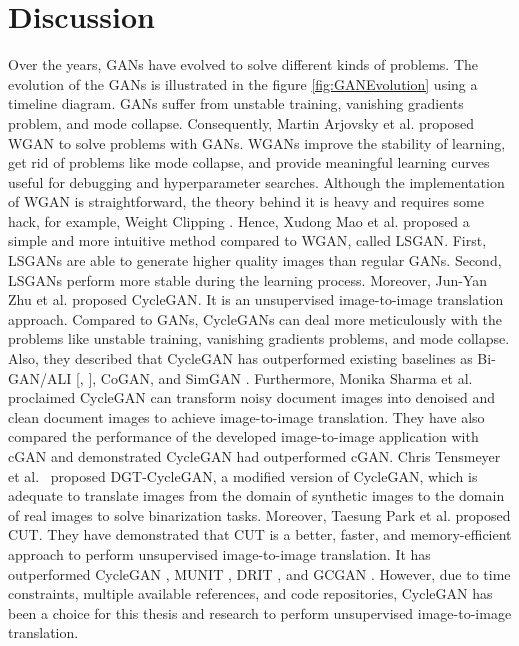 \section{Discussion}\label{rwdiscussion}
Over the years, \acp{GAN} have evolved to solve different kinds of problems. The evolution of the \acp{GAN} is illustrated in the figure \ref{fig:GANEvolution} using a timeline diagram. \acp{GAN} suffer from unstable training, vanishing gradients problem, and mode collapse. Consequently, Martin Arjovsky et al.\cite{arjovsky2017wasserstein} proposed \ac{WGAN} to solve problems with \acp{GAN}. \acp{WGAN} improve the stability of learning, get rid of problems like mode collapse, and provide meaningful learning curves useful for debugging and hyperparameter searches. Although the implementation of \ac{WGAN} is straightforward, the theory behind it is heavy and requires some hack, for example, Weight Clipping  \cite{gulrajani2017improved}. Hence, Xudong Mao et al.\cite{mao2017squares} proposed a simple and more intuitive method compared to \ac{WGAN}, called \ac{LSGAN}. First, \acp{LSGAN} are able to generate higher quality images than regular \acp{GAN}. Second, \acp{LSGAN} perform more stable during the learning process. Moreover, Jun-Yan Zhu et al.\cite{zhu2020unpaired} proposed \ac{CycleGAN}. It is an unsupervised image-to-image translation approach. Compared to \acp{GAN}, \acp{CycleGAN} can deal more meticulously with the problems like unstable training, vanishing gradients problems, and mode collapse. Also, they described that \ac{CycleGAN} has outperformed existing baselines as Bi-GAN/ALI [\cite{donahue2017adversarial}, \cite{dumoulin2017adversarially}], CoGAN\cite{liu2016coupled}, and SimGAN \cite{shrivastava2017learning}. Furthermore, Monika Sharma et al.\cite{sharma2019learning} proclaimed  \ac{CycleGAN} can transform noisy document images into denoised and clean document images to achieve image-to-image translation. They have also compared the performance of the developed image-to-image application with \ac{cGAN} and demonstrated \ac{CycleGAN} had outperformed \ac{cGAN}. Chris Tensmeyer et al.\ \cite{8978087} proposed DGT-CycleGAN, a modified version of \ac{CycleGAN}, which is adequate to translate images from the domain of synthetic images to the domain of real images to solve binarization tasks. Moreover, Taesung Park et al.\cite{park2020contrastive} proposed \ac{CUT}. They have demonstrated that \ac{CUT} is a better, faster, and memory-efficient approach to perform unsupervised image-to-image translation. It has outperformed \ac{CycleGAN} \cite{zhu2020unpaired}, \ac{MUNIT} \cite{liu2018unsupervised}, \ac{DRIT} \cite{lee2019drit}, and \ac{GCGAN} \cite{fu2018geometryconsistent}. However, due to time constraints, multiple available references, and code repositories, \ac{CycleGAN} has been a choice for this thesis and research to perform unsupervised image-to-image translation.


